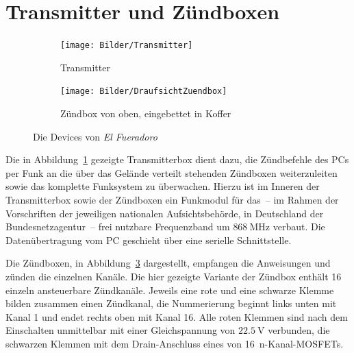 \documentclass[paper=a4, parskip, numbers=noenddot, toc=listof, headsepline]{scrbook}
\newcommand{\anlage}{\emph{El Fueradoro}}
\begin{document}
		\section{Transmitter und Zündboxen}

			\begin{figure}
				\centering
				\begin{subfigure}[t]{0.405\textwidth}
					\texttt{[image: Bilder/Transmitter]}
					\caption{Transmitter}
					\label{fig:transmitter}
				\end{subfigure}
				\begin{subfigure}[t]{0.55\textwidth}
					\texttt{[image: Bilder/DraufsichtZuendbox]}
					\caption{Zündbox von oben, eingebettet in Koffer}
					\label{fig:zuendbox}
				\end{subfigure}
				\caption{Die Devices von {\anlage}}
			\end{figure}

			Die in Abbildung~\ref{fig:transmitter} gezeigte Transmitterbox dient dazu, die Zündbefehle des PCs per Funk an die über das Gelände verteilt stehenden Zündboxen weiterzuleiten sowie das komplette Funksystem zu überwachen. Hierzu ist im Inneren der Transmitterbox sowie der Zündboxen ein Funkmodul für das~-- im Rahmen der Vorschriften der jeweiligen nationalen Aufsichtsbehörde, in Deutschland der Bundesnetzagentur~-- frei nutzbare Frequenzband um $\SI{868}{\mega\hertz}$ verbaut. Die Datenübertragung vom PC geschieht über eine serielle Schnittstelle.

			Die Zündboxen, in Abbildung~\ref{fig:zuendbox} dargestellt, empfangen die Anweisungen und zünden die einzelnen Kanäle. Die hier gezeigte Variante der Zündbox enthält 16 einzeln ansteuerbare Zündkanäle. Jeweils eine rote und eine schwarze Klemme bilden zusammen einen Zündkanal, die Nummerierung beginnt links unten mit Kanal 1 und endet rechts oben mit Kanal 16. Alle roten Klemmen sind nach dem Einschalten unmittelbar mit einer Gleichspannung von $\SI{22,5}{\volt}$ verbunden, die schwarzen Klemmen mit dem Drain-Anschluss eines von 16~n-Kanal-MOSFETs.
\end{document}
